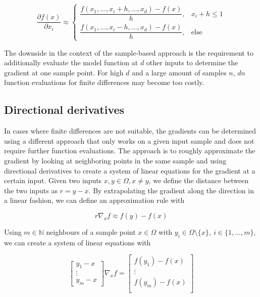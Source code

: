 \documentclass[
  a4paper,  %
  twoside,  %
  bibliography=totoc,
  headsepline,
  cleardoublepage=empty,
  parskip=half,
  draft=false
]{scrbook}
\begin{document}
\begin{equation}
\frac{\partial f(x)}{\partial x_i} \approx
\begin{cases}
    \dfrac{f(x_1, \dots, x_i + h, \dots, x_d) - f(x)}{h}, & x_i + h \leq 1 \\[1.5em]
    \dfrac{f(x_1, \dots, x_i - h, \dots, x_d) - f(x)}{h}, & \text{else}
\end{cases}
\end{equation}

The downside in the context of the sample-based approach is the requirement to additionally evaluate the model function at $d$ other inputs to determine the gradient at one sample point.
For high $d$ and a large amount of samples $n$, $dn$ function evaluations for finite differences may become too costly.

\subsection{Directional derivatives}

In cases where finite differences are not suitable, the gradients can be determined using a different approach that only works on a given input sample and does not require further function evaluations.
The approach is to roughly approximate the gradient by looking at neighboring points in the same sample and using directional derivatives to create a system of linear equations for the gradient at a certain input.
Given two inputs $x, y \in \Omega, x \neq y$, we define the distance between the two inputs as $r=y-x$.
By extrapolating the gradient along the direction in a linear fashion, we can define an approximation rule with

\begin{equation}
r \nabla_x f \approx f(y) - f(x)
\end{equation}

Using $m \in \mathds{N}$ neighbours of a sample point $x \in \Omega$ with $y_i \in \Omega \setminus \{x\}, ~ i \in \{1, \dots, m\}$, we can create a system of linear equations with

\begin{equation}
\begin{bmatrix}
    y_1 - x\\
    \vdots \\
    y_m - x
  \end{bmatrix}  \nabla_x f =\begin{bmatrix}
    f(y_1) - f(x) \\ \vdots \\  f(y_m) - f(x)
    \\
  \end{bmatrix}
  \label{eq:dd_sle}
\end{equation}
\end{document}
